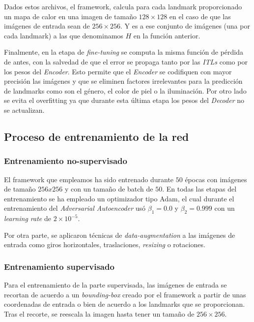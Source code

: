             \noindent Dados estos archivos, el framework, calcula para cada landmark proporcionado un mapa de calor en una imagen de tamaño $128 \times 128$ en el caso de que las imágenes de entrada sean de $256 \times 256$. Y es a ese conjunto de imágenes (una por cada landmark) a las que denominamos $H$ en la función anterior.

            \medskip

            \noindent Finalmente, en la etapa de \textit{fine-tuning} se computa la misma función de pérdida de antes, con la salvedad de que el error se propaga tanto por las \textit{ITLs} como por los pesos del \textit{Encoder}. Esto permite que el \textit{Encoder} se codifiquen con mayor precisión las imágenes y que se eliminen factores irrelevantes para la predicción de landmarks como son el género, el color de piel o la iluminación. Por otro lado se evita el overfitting ya que durante esta última etapa los pesos del \textit{Decoder} no se actualizan.

        \subsection{Proceso de entrenamiento de la red}

            \subsubsection{Entrenamiento no-supervisado}
                \noindent El framework que empleamos ha sido entrenado durante $50$ épocas con imágenes de tamaño $256x256$ y con un tamaño de batch de $50$. En todas las etapas del entrenamiento se ha empleado un optimizador tipo Adam, el cual durante el entrenamiento del \textit{Adversarial Autoencoder} usó $\beta_1=0.0$ y $\beta_2=0.999$ con un \textit{learning rate} de $2\times 10^{-5}$.

                \medskip

                \noindent Por otra parte, se aplicaron técnicas de \textit{data-augmentation} a las imágenes de entrada como giros horizontales, traslaciones, \textit{resizing} o rotaciones.

            \subsubsection{Entrenamiento supervisado}
                \noindent Para el entrenamiento de la parte supervisada, las imágenes de entrada se recortan de acuerdo a un \textit{bounding-box} creado por el framework a partir de unas coordenadas de entrada o bien de acuerdo a los landmarks que se proporcionan. Tras el recorte, se reescala la imagen hasta tener un tamaño de $256\times256$. 
                

